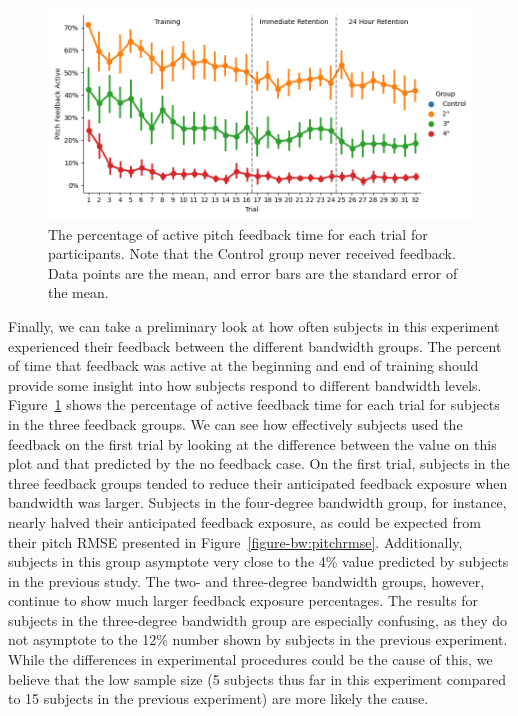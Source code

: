 \begin{figure}[tb!]
    \begin{center}
        \includegraphics[width=\linewidth]{figures/Aircraft/Bandwidth-PitchFeedbackOn.png}
        \caption[The percentage of active pitch feedback time for each trial]{The percentage of active pitch feedback time for each trial for participants. Note that the Control group never received feedback. Data points are the mean, and error bars are the standard error of the mean.}
        \label{figure-bw:pitchfeedback}
    \end{center}
\end{figure}

Finally, we can take a preliminary look at how often subjects in this experiment experienced their feedback between the different bandwidth groups.
The percent of time that feedback was active at the beginning and end of training should provide some insight into how subjects respond to different bandwidth levels.
Figure~\ref{figure-bw:pitchfeedback} shows the percentage of active feedback time for each trial for subjects in the three feedback groups.
We can see how effectively subjects used the feedback on the first trial by looking at the difference between the value on this plot and that predicted by the no feedback case.
On the first trial, subjects in the three feedback groups tended to reduce their anticipated feedback exposure when bandwidth was larger.
Subjects in the four-degree bandwidth group, for instance, nearly halved their anticipated feedback exposure, as could be expected from their pitch RMSE presented in Figure~\ref{figure-bw:pitchrmse}.
Additionally, subjects in this group asymptote very close to the 4\% value predicted by subjects in the previous study.
The two- and three-degree bandwidth groups, however, continue to show much larger feedback exposure percentages.
The results for subjects in the three-degree bandwidth group are especially confusing, as they do not asymptote to the 12\% number shown by subjects in the previous experiment.
While the differences in experimental procedures could be the cause of this, we believe that the low sample size (5 subjects thus far in this experiment compared to 15 subjects in the previous experiment) are more likely the cause.

